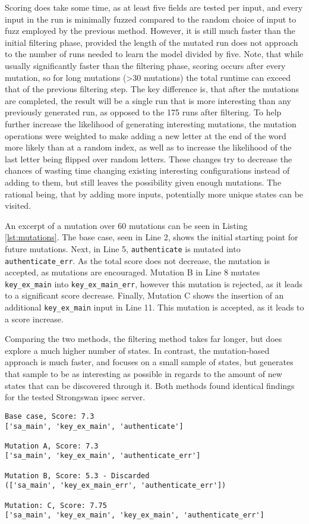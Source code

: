 Scoring does take some time, as at least five fields are tested per input, and every input in the run is minimally fuzzed compared to the random choice of input to fuzz employed by the previous method. However, it is still much faster than the initial filtering phase, provided the length of the mutated run does not approach to the number of runs needed to learn the model divided by five. Note, that while usually significantly faster than the filtering phase, scoring occurs after every mutation, so for long mutations (>30 mutations) the total runtime can exceed that of the previous filtering step. The key difference is, that after the mutations are completed, the result will be a single run that is more interesting than any previously generated run, as opposed to the 175 runs after filtering. To help further increase the likelihood of generating interesting mutations, the mutation operations were weighted to make adding a new letter at the end of the word more likely than at a random index, as well as to increase the likelihood of the last letter being flipped over random letters. These changes try to decrease the chances of wasting time changing existing interesting configurations instead of adding to them, but still leaves the possibility given enough mutations. The rational being, that by adding more inputs, potentially more unique states can be visited. 

An excerpt of a mutation over 60 mutations can be seen in Listing \ref{lst:mutations}. The base case, seen in Line 2, shows the initial starting point for future mutations. Next, in Line 5, \texttt{authenticate} is mutated into \texttt{authenticate\_err}. As the total score does not decrease, the mutation is accepted, as mutations are encouraged. Mutation B in Line 8 mutates \texttt{key\_ex\_main} into \texttt{key\_ex\_main\_err}, however this mutation is rejected, as it leads to a significant score decrease. Finally, Mutation C shows the insertion of an additional \texttt{key\_ex\_main} input in Line 11. This mutation is accepted, as it leads to a score increase.

Comparing the two methods, the filtering method takes far longer, but does explore a much higher number of states. In contrast, the mutation-based approach is much faster, and focuses on a small sample of states, but generates that sample to be as interesting as possible in regards to the amount of new states that can be discovered through it.
Both methods found identical findings for the tested Strongswan \ac{ipsec} server.


\begin{lstlisting}[float=h, caption=Mutations, label=lst:mutations]
Base case, Score: 7.3
['sa_main', 'key_ex_main', 'authenticate']

Mutation A, Score: 7.3
['sa_main', 'key_ex_main', 'authenticate_err']

Mutation B, Score: 5.3 - Discarded 
(['sa_main', 'key_ex_main_err', 'authenticate_err'])

Mutation: C, Score: 7.75
['sa_main', 'key_ex_main', 'key_ex_main', 'authenticate_err']
\end{lstlisting}
